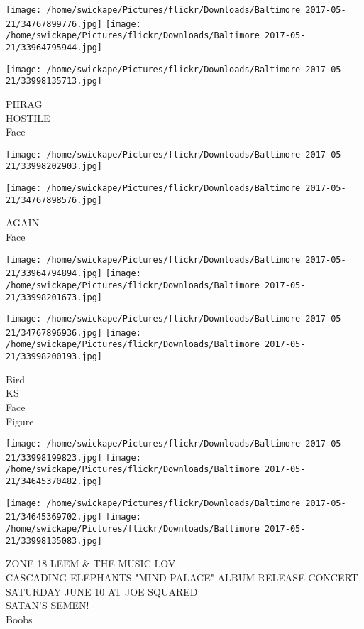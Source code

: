 \documentclass[10pt,letterpaper]{article}
\begin{document}
\texttt{[image: /home/swickape/Pictures/flickr/Downloads/Baltimore 2017-05-21/34767899776.jpg]}
\texttt{[image: /home/swickape/Pictures/flickr/Downloads/Baltimore 2017-05-21/33964795944.jpg]}

\vspace{0.25in}
\texttt{[image: /home/swickape/Pictures/flickr/Downloads/Baltimore 2017-05-21/33998135713.jpg]}

PHRAG\\
HOSTILE\\
Face\\
\pagebreak

\texttt{[image: /home/swickape/Pictures/flickr/Downloads/Baltimore 2017-05-21/33998202903.jpg]}

\vspace{0.25in}
\texttt{[image: /home/swickape/Pictures/flickr/Downloads/Baltimore 2017-05-21/34767898576.jpg]}

AGAIN\\
Face\\
\pagebreak

\texttt{[image: /home/swickape/Pictures/flickr/Downloads/Baltimore 2017-05-21/33964794894.jpg]}
\texttt{[image: /home/swickape/Pictures/flickr/Downloads/Baltimore 2017-05-21/33998201673.jpg]}

\texttt{[image: /home/swickape/Pictures/flickr/Downloads/Baltimore 2017-05-21/34767896936.jpg]}
\texttt{[image: /home/swickape/Pictures/flickr/Downloads/Baltimore 2017-05-21/33998200193.jpg]}

Bird\\
KS\\
Face\\
Figure\\
\pagebreak

\texttt{[image: /home/swickape/Pictures/flickr/Downloads/Baltimore 2017-05-21/33998199823.jpg]}
\texttt{[image: /home/swickape/Pictures/flickr/Downloads/Baltimore 2017-05-21/34645370482.jpg]}

\texttt{[image: /home/swickape/Pictures/flickr/Downloads/Baltimore 2017-05-21/34645369702.jpg]}
\texttt{[image: /home/swickape/Pictures/flickr/Downloads/Baltimore 2017-05-21/33998135083.jpg]}

ZONE 18 LEEM \& THE MUSIC LOV\\
CASCADING ELEPHANTS "MIND PALACE" ALBUM RELEASE CONCERT SATURDAY JUNE 10 AT JOE SQUARED\\
SATAN'S SEMEN!\\
Boobs\\
\pagebreak
\end{document}
